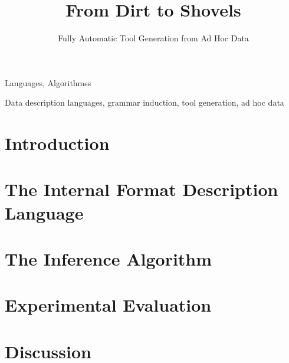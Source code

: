 \documentclass[natbib]{sigplanconf}
\begin{document}

\title{From Dirt to Shovels}
\subtitle{Fully Automatic Tool Generation from Ad Hoc Data}

       {}
       {}
       {}


\maketitle{}

\begin{abstract}  

\end{abstract}


\terms
Languages, Algorithmss

\keywords
Data description languages, grammar induction, tool generation, ad hoc data


\section {Introduction}
\label{sec:intro}


\section{The Internal Format Description Language}
\label{sec:review}


\section{The Inference Algorithm}
\label{sec:inference}


\section{Experimental Evaluation}
\label{sec:exp}


\section{Discussion}
\label{sec:discussion}

\end{document}
